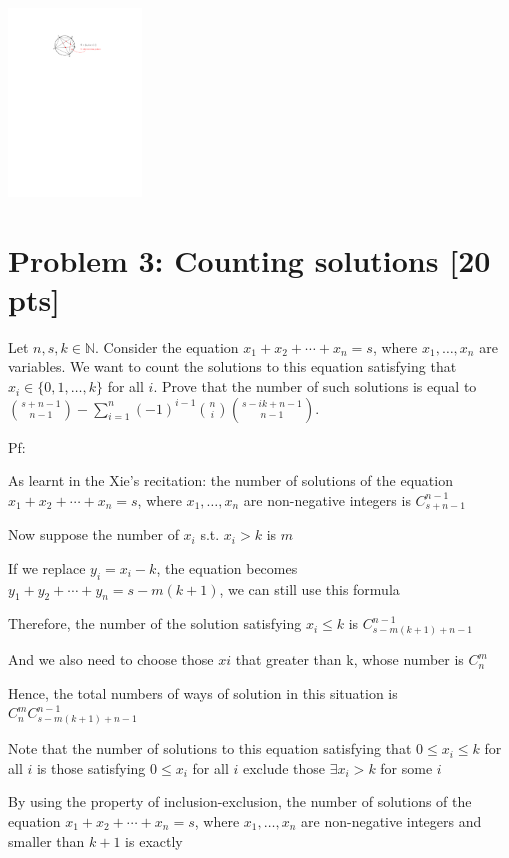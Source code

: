\documentclass[11pt,twoside]{article}
\newcommand{\problem}[1]{\section*{Problem #1}}
\begin{document}
\begin{center}
    \includegraphics[height=5cm]{hw-fig-intersection.pdf}
\end{center}

\problem{3: Counting solutions [20 pts]}
Let $n,s,k \in \mathbb{N}$.
Consider the equation $x_1+x_2+\cdots+x_n = s$, where $x_1,\dots,x_n$ are variables.
We want to count the solutions to this equation satisfying that $x_i \in \{0,1,\dots,k\}$ for all $i$.
Prove that the number of such solutions is equal to $\binom{s+n-1}{n-1} - \sum_{i=1}^n (-1)^{i-1} \binom{n}{i} \binom{s-ik+n-1}{n-1}$.

\hspace*{\fill}

Pf:

As learnt in the Xie's recitation: the number of solutions of the equation $x_1+x_2+\cdots+x_n = s$, where $x_1,\dots,x_n$ are non-negative integers is $C^{n-1}_{s+n-1}$

Now suppose the number of $x_i$ s.t. $x_i > k $ is $m$

If we replace $y_i = x_i - k$, the equation becomes $y_1+y_2+\cdots+y_n = s-m(k+1)$, we can still use this formula

Therefore, the number of the solution satisfying $x_i \leq k$ is $C^{n-1}_{s-m(k+1)+n-1}$

And we also need to choose those $xi$ that greater than k, whose number is $C^m_n$

Hence, the total numbers of ways of solution in this situation is $C^m_nC^{n-1}_{s-m(k+1)+n-1}$

Note that the number of solutions to this equation satisfying that $0\leq x_i \leq k$ for all $i$ is those satisfying $0\leq x_i$ for all $i$ exclude those $\exists x_i > k$ for some $i$

By using the property of inclusion-exclusion, the number of solutions of the equation $x_1+x_2+\cdots+x_n = s$, where $x_1,\dots,x_n$ are non-negative integers and smaller than $k+1$ is exactly
\end{document}

